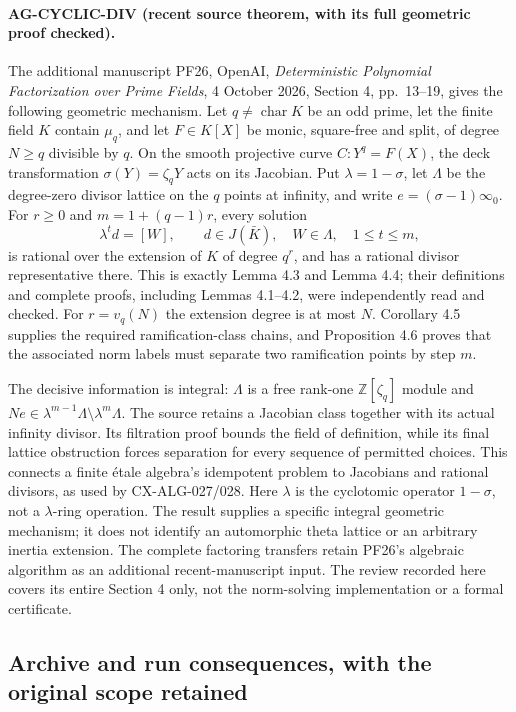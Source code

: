 \documentclass[11pt,a4paper]{article}
\begin{document}
\paragraph{AG-CYCLIC-DIV (recent source theorem, with its full geometric proof checked).}
The additional manuscript PF26, OpenAI,
\emph{Deterministic Polynomial Factorization over Prime Fields},
4 October 2026, Section 4, pp.~13--19, gives the following
geometric mechanism. Let $q\ne\operatorname{char}K$ be an odd
prime, let the finite field $K$ contain $\mu_q$, and let
$F\in K[X]$ be monic, square-free and split, of degree
$N\ge q$ divisible by $q$. On the smooth projective curve
$C:Y^q=F(X)$, the deck transformation $\sigma(Y)=\zeta_qY$
acts on its Jacobian. Put $\lambda=1-\sigma$, let $\Lambda$
be the degree-zero divisor lattice on the $q$ points at infinity,
and write $e=(\sigma-1)\infty_0$.
For $r\ge0$ and $m=1+(q-1)r$, every solution
\[
 \lambda^t d=[W],\qquad d\in J(\bar K),\quad
 W\in\Lambda,\quad 1\le t\le m,
\]
is rational over the extension of $K$ of degree $q^r$, and
has a rational divisor representative there. This is exactly
Lemma 4.3 and Lemma 4.4; their definitions and complete proofs,
including Lemmas 4.1--4.2, were independently read and checked.
For $r=v_q(N)$ the extension degree is at most $N$.
Corollary 4.5 supplies the required ramification-class chains,
and Proposition 4.6 proves that the associated norm labels
must separate two ramification points by step $m$.

The decisive information is integral: $\Lambda$ is a free
rank-one $\mathbb Z[\zeta_q]$ module and
$Ne\in\lambda^{m-1}\Lambda\setminus\lambda^m\Lambda$.
The source retains a Jacobian class together with its actual
infinity divisor. Its filtration proof bounds the field of
definition, while its final lattice obstruction forces
separation for every sequence of permitted choices. This
connects a finite \'etale algebra's idempotent problem to
Jacobians and rational divisors, as used by CX-ALG-027/028.
Here $\lambda$ is the cyclotomic operator $1-\sigma$, not
a $\lambda$-ring operation. The result supplies a specific
integral geometric mechanism; it does not identify an
automorphic theta lattice or an arbitrary inertia extension.
The complete factoring transfers retain PF26's algebraic
algorithm as an additional recent-manuscript input. The
review recorded here covers its entire Section 4 only, not
the norm-solving implementation or a formal certificate.

\subsection{Archive and run consequences, with the original scope retained}
\label{ag:archive}
\end{document}

